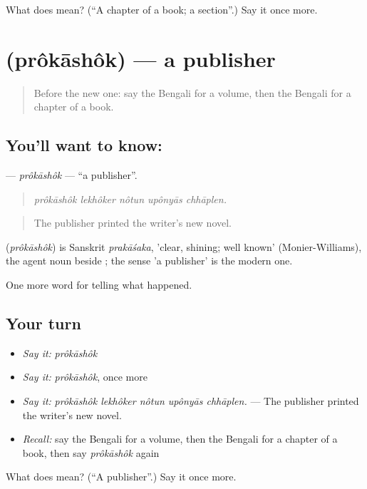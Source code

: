 \begin{tcolorbox}[breakable,colback=teal!4,colframe=teal!35!black,title={Before you move on}]
What does  mean? (\textquotedblleft{}A chapter of a book; a section\textquotedblright{}.) Say it once more.
\end{tcolorbox}
\section[\texorpdfstring{\bn{প্রকাশক} (prôkāshôk)}{প্রকাশক (prôkāshôk)}]{ (prôkāshôk) — a publisher}

\label{lesson:BN-C327-prokashok}



\begin{quote}
Before the new one: say the Bengali for a volume, then the Bengali for a chapter of a book.
\end{quote}

\subsection*{You'll want to know: }
\textbf{} — \emph{prôkāshôk} — \textquotedblleft{}a publisher\textquotedblright{}.

\begin{quote}
    
\end{quote}

\begin{quote}
\emph{prôkāshôk lekhôker nôtun upônyās chhāplen.}
\end{quote}

\begin{quote}
The publisher printed the writer's new novel.
\end{quote}

\begin{cousinweb}
\textbf{} (\emph{prôkāshôk}) is Sanskrit \emph{prakāśaka}, 'clear, shining; well known' (Monier-Williams), the agent noun beside \textbf{ }; the sense 'a publisher' is the modern one.
\end{cousinweb}

\begin{grammarlens}[title={What you've built}]
One more word for telling what happened.
\end{grammarlens}

\subsection*{Your turn}
\begin{itemize}
\raggedright
  \item \emph{Say it:} \emph{prôkāshôk}
  \item \emph{Say it:} \emph{prôkāshôk}, once more
  \item \emph{Say it:} \emph{prôkāshôk lekhôker nôtun upônyās chhāplen.} — The publisher printed the writer's new novel.
  \item \emph{Recall:} say the Bengali for a volume, then the Bengali for a chapter of a book, then say \emph{prôkāshôk} again
\end{itemize}

\begin{tcolorbox}[breakable,colback=teal!4,colframe=teal!35!black,title={Before you move on}]
What does  mean? (\textquotedblleft{}A publisher\textquotedblright{}.) Say it once more.
\end{tcolorbox}
